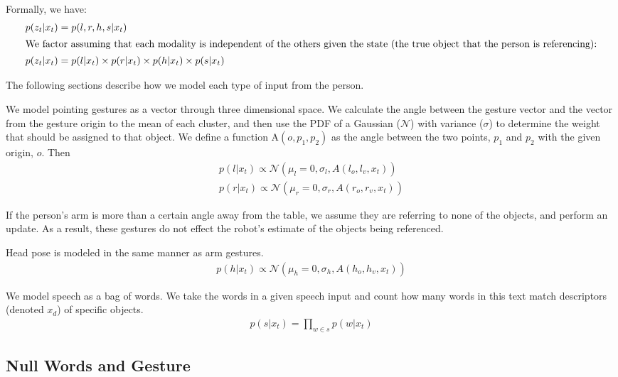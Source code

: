 \documentclass[letterpaper, 10 pt, conference]{ieeeconf}
\begin{document}
Formally, we have:
\begin{align}
p(z_t | x_t) &= p(l, r, h, s | x_t)\\
\intertext{We factor assuming that each modality is independent of the others given the state (the true object that the person is referencing):}
p(z_t | x_t) &= p(l | x_t) \times p(r | x_t) \times p(h | x_t) \times p(s | x_t)
\end{align}

\noindent The following sections describe how we model each type of
input from the person.

  We model pointing gestures as a vector
through three dimensional space. We calculate the angle between the
gesture vector and the vector from the gesture origin to the mean of
each cluster, and then use the PDF of a Gaussian ($\mathcal{N}$) with variance ($\sigma$) to determine the weight that should be
assigned to that object. We define a function $\mbox{A}(o, p_1, p_2)$ as the
angle between the two points, $p_1$ and $p_2$ with the given origin,
$o$.  Then 
\begin{align}
p(l | x_t) \propto \mathcal{N}(\mu_l=0, \sigma_l,A(l_o, l_v, x_t))\\
p(r | x_t) \propto \mathcal{N}(\mu_r=0, \sigma_r,A(r_o, r_v, x_t))
\end{align}

If the person's arm is more than a certain angle away from the table,
we assume they are referring to none of the objects, and perform an
update.  As a result, these gestures do not effect the robot's
estimate of the objects being referenced.

Head pose is modeled in the same manner as arm gestures.
\begin{align}
p(h | x_t) \propto \mathcal{N}(\mu_h=0, \sigma_h,A(h_o, h_v, x_t))
\end{align}


  We model speech as a bag of words. We
take the words in a given speech input and count how many words in
this text match descriptors (denoted $x_d$) of specific objects.
\begin{align}
p(s |x_t) = \displaystyle \prod_{w \in s} p(w | x_t)
\end{align}


\subsection{Null Words and Gesture}
\end{document}
